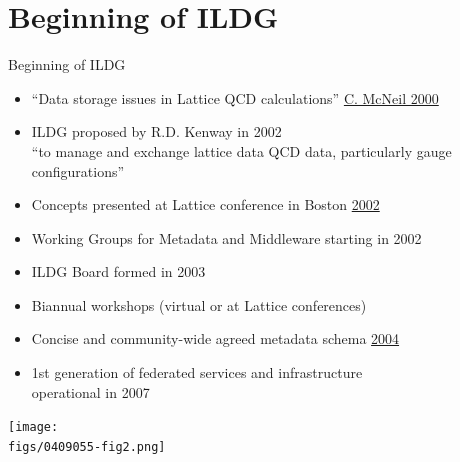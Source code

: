 \documentclass[aspectratio=169,xcolor=dvipsnames]{beamer}
\newcommand{\bi}{\begin{itemize}}
\newcommand{\ei}{\end{itemize}}
\def\figs{figs1}
\begin{document}
\section{Beginning of ILDG}
\begin{frame}{Beginning of ILDG}

  \bi
  \item ``Data storage issues in Lattice QCD calculations'' \href{https://arxiv.org/abs/hep-lat/0003009}{C. McNeil 2000}
  \item ILDG proposed by R.D. Kenway in 2002 \\
        ``to manage and exchange lattice data QCD data, particularly gauge configurations''
  \item Concepts presented at Lattice conference in Boston \href{https://arxiv.org/abs/hep-lat/0209121}{2002}
  \item Working Groups for Metadata and Middleware starting in 2002
  \item ILDG Board formed in 2003
  \item Biannual workshops (virtual or at Lattice conferences)
  \item Concise and community-wide agreed \alert{metadata schema} \href{https://arxiv.org/abs/hep-lat/0409055}{2004}
  \item 1st generation of \alert{federated services and infrastructure}\\
        operational in 2007
  \ei

  \vspace*{-30mm}
  \hfill
  \texttt{[image: \\figs/0409055-fig2.png]}
  
\end{frame}
\end{document}
